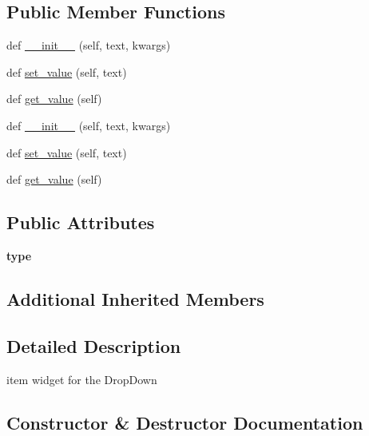 \subsection*{Public Member Functions}
\begin{DoxyCompactItemize}
\item 
def \hyperlink{classremi_1_1gui_1_1DropDownItem_aafd68555ff3bbdf04f8e51d7c2459c93}{\+\_\+\+\_\+init\+\_\+\+\_\+} (self, text, kwargs)
\item 
def \hyperlink{classremi_1_1gui_1_1DropDownItem_a18d8e0ca92616106b1466b8f38946dfc}{set\+\_\+value} (self, text)
\item 
def \hyperlink{classremi_1_1gui_1_1DropDownItem_ac5d1b141b84d264375b5633f86ce87fb}{get\+\_\+value} (self)
\item 
def \hyperlink{classremi_1_1gui_1_1DropDownItem_aafd68555ff3bbdf04f8e51d7c2459c93}{\+\_\+\+\_\+init\+\_\+\+\_\+} (self, text, kwargs)
\item 
def \hyperlink{classremi_1_1gui_1_1DropDownItem_a18d8e0ca92616106b1466b8f38946dfc}{set\+\_\+value} (self, text)
\item 
def \hyperlink{classremi_1_1gui_1_1DropDownItem_ac5d1b141b84d264375b5633f86ce87fb}{get\+\_\+value} (self)
\end{DoxyCompactItemize}
\subsection*{Public Attributes}
\begin{DoxyCompactItemize}
\item 
{\bfseries type}\hypertarget{classremi_1_1gui_1_1DropDownItem_af06466cb76e9481323a9c71c574c0863}{}\label{classremi_1_1gui_1_1DropDownItem_af06466cb76e9481323a9c71c574c0863}

\end{DoxyCompactItemize}
\subsection*{Additional Inherited Members}


\subsection{Detailed Description}
\begin{DoxyVerb}item widget for the DropDown\end{DoxyVerb}
 

\subsection{Constructor \& Destructor Documentation}
